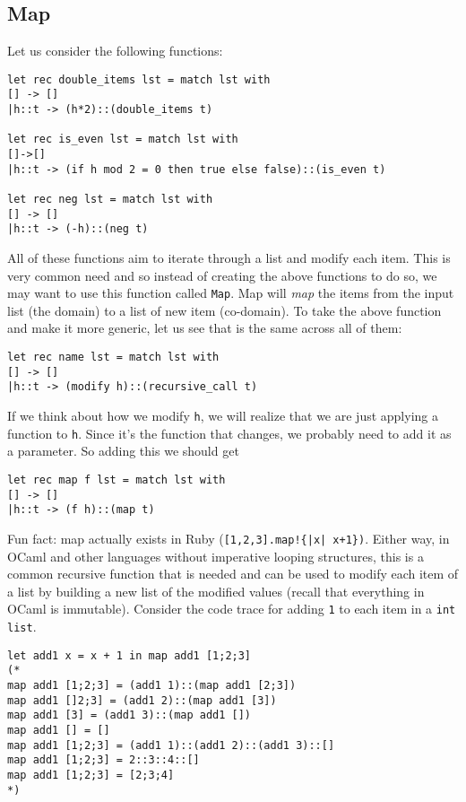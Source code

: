 \documentclass[main.tex]{subfiles}
\begin{document}
\subsection{Map}
Let us consider the following functions: 
\begin{lstlisting}[style=Myocamlstyle]
let rec double_items lst = match lst with 
[] -> []
|h::t -> (h*2)::(double_items t)

let rec is_even lst = match lst with
[]->[]
|h::t -> (if h mod 2 = 0 then true else false)::(is_even t)

let rec neg lst = match lst with
[] -> []
|h::t -> (-h)::(neg t) 
\end{lstlisting}
All of these functions aim to iterate through a list and modify each item. This is very common need and so instead of creating the above functions to do so, we may want to use this function called \texttt{Map}. Map will \textit{map} the items from the input list (the domain) to a list of new item (co-domain). To take the above function and make it more generic, let us see that is the same across all of them:
\begin{lstlisting}[style=Myocamlstyle]
let rec name lst = match lst with
[] -> []
|h::t -> (modify h)::(recursive_call t)
\end{lstlisting}
If we think about how we modify \texttt{h}, we will realize that we are just applying a function to \texttt{h}. Since it's the function that changes, we probably need to add it as a parameter. So adding this we should get
\begin{lstlisting}[style=Myocamlstyle]
let rec map f lst = match lst with 
[] -> []
|h::t -> (f h)::(map t)
\end{lstlisting}
Fun fact: map actually exists in Ruby (\texttt{[1,2,3].map!\{|x| x+1\})}. Either way, in OCaml and other languages without imperative looping structures, this is a common recursive function that is needed and can be used to modify each item of a list by building a new list of the modified values (recall that everything in OCaml is immutable). 
Consider the code trace for adding \texttt{1} to each item in a \texttt{int list}. 
\begin{lstlisting}[style=Myocamlstyle]
let add1 x = x + 1 in map add1 [1;2;3]
(*
map add1 [1;2;3] = (add1 1)::(map add1 [2;3])
map add1 []2;3] = (add1 2)::(map add1 [3])
map add1 [3] = (add1 3)::(map add1 [])
map add1 [] = []
map add1 [1;2;3] = (add1 1)::(add1 2)::(add1 3)::[]
map add1 [1;2;3] = 2::3::4::[]
map add1 [1;2;3] = [2;3;4]
*)
\end{lstlisting}
\end{document}

